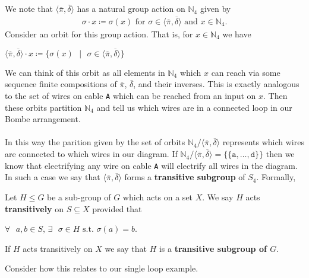 \\\\We note that $\langle\overline\pi, \overline\delta\rangle$ has a natural group action on $\mathbb{N}_{4}$ given by
\begin{align*}
	\sigma\cdot{x} \coloneq \sigma(x)\text{ for }\sigma\in\langle\overline\pi, \overline\delta\rangle\text{ and }x\in\mathbb{N}_{4}.
\end{align*}
Consider an orbit for this group action. That is, for $x\in\mathbb{N}_{4}$ we have
\begin{center}
	$\langle\overline\pi, \overline\delta\rangle\cdot x\coloneq\{\sigma(x)\text{ }|\text{ }\sigma\in\langle\overline\pi, \overline\delta\rangle\}$
\end{center}
\noindent We can think of this orbit as all elements in $\mathbb{N}_{4}$ which $x$ can reach via some sequence finite compositions of $\overline\pi$, $\overline\delta$, and their inverses. This is exactly analogous to the set of wires on cable \texttt{A} which can be reached from an input on $x$. Then these orbits partition $\mathbb{N}_{4}$ and tell us which wires are in a connected loop in our Bombe arrangement.
\\\\In this way the parition given by the set of orbits $\mathbb{N}_{4}/\langle\overline\pi, \overline\delta\rangle$ represents which wires are connected to which wires in our diagram. If $\mathbb{N}_{4}/\langle\overline\pi, \overline\delta\rangle = \{\{\texttt{a},\dots,\texttt{d}\}\}$ then we know that electrifying any wire on cable \texttt{A} will electrify all wires in the diagram. In such a case we say that $\langle\overline\pi, \overline\delta\rangle$ forms a {\bf{transitive subgroup}} of $S_4$. Formally,
\begin{definition}
	Let $H\le{G}$ be a sub-group of $G$ which acts on a set $X$. We say $H$ acts {\bf{transitively}} on $S\subseteq{X}$ provided that
	\begin{center}
		$\forall\text{ }a,b\in S\text{, }\exists\text{ }\sigma\in{H}\text{ s.t. }\sigma(a)=b$.
	\end{center}
	If $H$ acts transitively on $X$ we say that $H$ is a {\bf{transitive subgroup of $G$}}.
\end{definition}
\noindent Consider how this relates to our single loop example.

